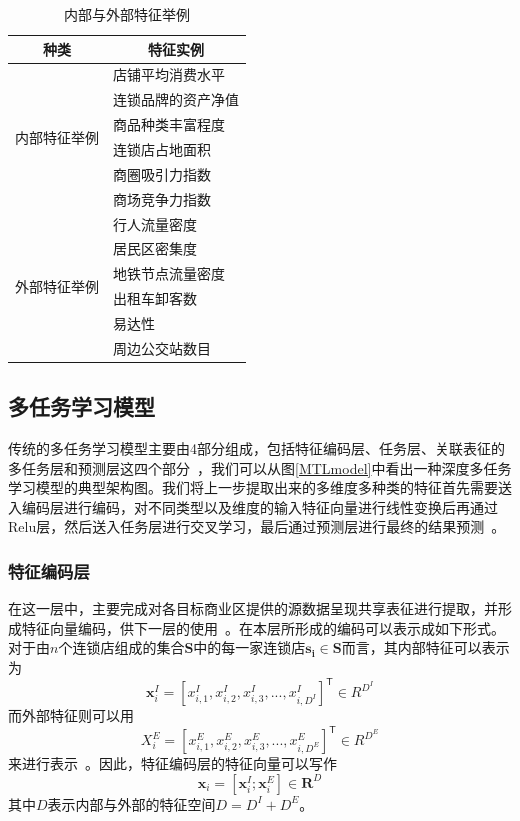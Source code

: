 \documentclass{llncs}
\begin{document}
\begin{table}
	\centering
	\caption{内部与外部特征举例}
	\label{feature}
	\begin{tabular}{c|p{8cm}<{\centering}}
		\hline
		\textbf{种类}  & \multicolumn{1}{c}{\textbf{特征实例}}         \\ \hline
		\multirow{6}{*}{内部特征举例} & 店铺平均消费水平 \\ \cline{2-2} 
		                              & 连锁品牌的资产净值 \\ \cline{2-2}
		                              & 商品种类丰富程度   \\ \cline{2-2}
		                              & 连锁店占地面积   \\ \cline{2-2}
		                              & 商圈吸引力指数  \\ \cline{2-2}
									 & 商场竞争力指数   \\ \hline \hline
		\multirow{6}{*}{外部特征举例} & 行人流量密度   \\ \cline{2-2}
									 & 居民区密集度   \\ \cline{2-2}
									 & 地铁节点流量密度   \\ \cline{2-2}
									 & 出租车卸客数   \\ \cline{2-2}
		                             & 易达性       \\ \cline{2-2}
		                             & 周边公交站数目 \\ \hline
	\end{tabular}
\end{table}


\subsection{多任务学习模型}
传统的多任务学习模型主要由4部分组成，包括特征编码层、任务层、关联表征的多任务层和预测层这四个部分~\cite{Caruana1997Multitask,Caruana2012A}，我们可以从图\ref{MTLmodel}中看出一种深度多任务学习模型的典型架构图。我们将上一步提取出来的多维度多种类的特征首先需要送入编码层进行编码，对不同类型以及维度的输入特征向量进行线性变换后再通过Relu层，然后送入任务层进行交叉学习，最后通过预测层进行最终的结果预测~\cite{zheng2014urban,Gong2014Efficient}。
\subsubsection{特征编码层}
在这一层中，主要完成对各目标商业区提供的源数据呈现共享表征进行提取，并形成特征向量编码，供下一层的使用~\cite{mariani2018business}。在本层所形成的编码可以表示成如下形式。对于由$n$个连锁店组成的集合$\mathbf{S}$中的每一家连锁店$\mathbf{s_i} \in \mathbf{S}$而言，其内部特征可以表示为
$$\mathbf{x}_i^I = [x_{i,1}^I,x_{i,2}^I,x_{i,3}^I,...,x_{i,D^I}^I]^\mathsf{T} \in R^{D^I}$$
而外部特征则可以用
$$X_i^E = [x_{i,1}^E,x_{i,2}^E,x_{i,3}^E,...,x_{i,D^E}^E]^\mathsf{T} \in R^{D^E}$$
来进行表示~\cite{Wang2018Searchable}。因此，特征编码层的特征向量可以写作
$$\mathbf{x}_i = [\mathbf{x}_i^I;\mathbf{x}_i^E] \in \mathbf{R} ^ D$$
其中$D$表示内部与外部的特征空间$D = D^I + D^E$。
\end{document}
